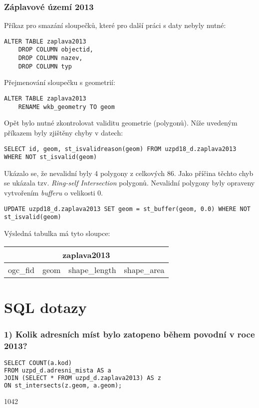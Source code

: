 \documentclass[a4paper, 12pt]{article}
\begin{document}
\subsubsection*{Záplavové území 2013}
Příkaz pro smazání sloupečků, které pro další práci s daty nebyly nutné:
\begin{lstlisting}
ALTER TABLE zaplava2013
    DROP COLUMN objectid,
    DROP COLUMN nazev,
    DROP COLUMN typ
\end{lstlisting}
Přejmenování sloupečku s geometrií:
\begin{lstlisting}
ALTER TABLE zaplava2013
    RENAME wkb_geometry TO geom
\end{lstlisting} 
Opět bylo nutné zkontrolovat validitu geometrie (polygonů). Níže uvedeným příkazem byly zjištěny chyby v datech:
\begin{lstlisting}
SELECT id, geom, st_isvalidreason(geom) FROM uzpd18_d.zaplava2013 WHERE NOT st_isvalid(geom)
\end{lstlisting}
Ukázalo se, že nevalidní byly 4 polygony z celkových 86. Jako příčina těchto chyb se ukázala tzv. \textit{Ring-self Intersection} polygonů. Nevalidní polygony byly opraveny vytvoře\-ním \textit{bufferu} o velikosti 0. 
\begin{lstlisting}
UPDATE uzpd18_d.zaplava2013 SET geom = st_buffer(geom, 0.0) WHERE NOT st_isvalid(geom)
\end{lstlisting}
Výsledná tabulka má tyto sloupce:

\begin{table}[h!]
\centering
\begin{tabular}{|c|c|c|c|}
\hline
\multicolumn{4}{|c|}{\textbf{zaplava2013}}    \\ \hline
ogc\_fid & geom & shape\_length & shape\_area \\ \hline
\end{tabular}
\end{table}
\clearpage

\section{SQL dotazy}
\subsubsection*{1) Kolik adresních míst bylo zatopeno během povodní v roce 2013?}
\begin{lstlisting}[language=html]
SELECT COUNT(a.kod) 
FROM uzpd_d.adresni_mista AS a
JOIN (SELECT * FROM uzpd_d.zaplava2013) AS z
ON st_intersects(z.geom, a.geom);
\end{lstlisting}
1042
\vspace{0.8cm}
\end{document}
